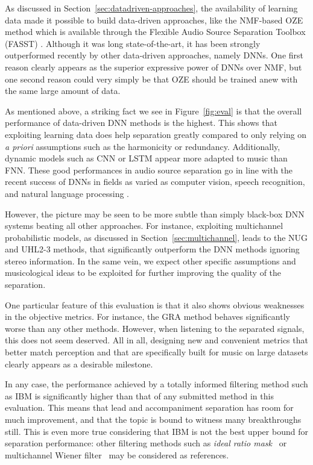 As discussed in Section~\ref{sec:datadriven-approaches}, the availability of learning data made it possible to build data-driven approaches, like the NMF-based OZE method which is available through the Flexible Audio Source Separation Toolbox (FASST) \cite{salaun14,ozerov12}. Although it was long state-of-the-art, it has been strongly outperformed recently by other data-driven approaches, namely DNNs. One first reason clearly appears as the superior expressive power of DNNs over NMF, but one second reason could very simply be that OZE should be trained anew with the same large amount of data.

As mentioned above, a striking fact we see in Figure~\ref{fig:eval} is that the overall performance of data-driven DNN methods is the highest. This shows that exploiting learning data does help separation greatly compared to only relying on \textit{a priori} assumptions such as the harmonicity or redundancy. Additionally, dynamic models such as CNN or LSTM appear more adapted to music than FNN. These good performances in audio source separation go in line with the recent success of DNNs in fields as varied as computer vision, speech recognition, and natural language processing \cite{lecun15}.

However, the picture may be seen to be more subtle than simply black-box DNN systems beating all other approaches. For instance, exploiting multichannel probabilistic models, as discussed in Section~\ref{sec:multichannel}, leads to the NUG and UHL2-3 methods, that significantly outperform the DNN methods ignoring stereo information. In the same vein, we expect other specific assumptions and musicological ideas to be exploited for further improving the quality of the separation.

One particular feature of this evaluation is that it also shows obvious weaknesses in the objective metrics. For instance, the GRA method behaves significantly worse than any other methods. However, when listening to the separated signals, this does not seem deserved. All in all, designing new and convenient metrics that better match perception and that are specifically built for music on large datasets clearly appears as a desirable milestone.

In any case, the performance achieved by a totally informed filtering method such as IBM is significantly higher than that of any submitted method in this evaluation. This means that lead and accompaniment separation has room for much improvement, and that the topic is bound to witness many breakthroughs still. This is even more true considering that IBM is not the best upper bound for separation performance: other filtering methods such as \textit{ideal ratio mask}~\cite{liutkus15c} or multichannel Wiener filter~\cite{duong10} may be considered as references.

